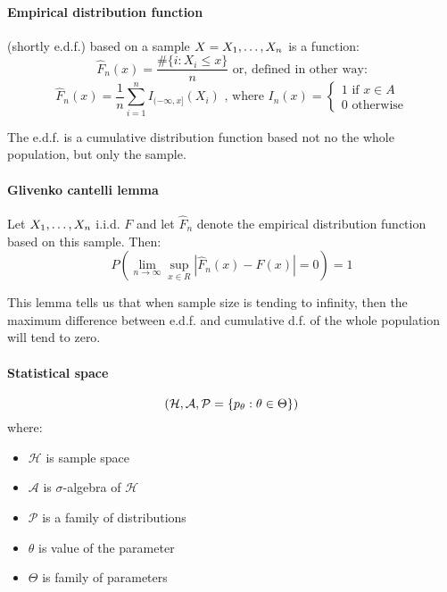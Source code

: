 \paragraph{Empirical distribution function} (shortly e.d.f.)
based on a sample $X = X_{1}, \ldots, X_{n}$ is a function:
\[ \hat{F}_n(x) = \frac{\#\{i: X_i \leq x\}}{n} \mbox{ or, defined in other way:} \]
\[ \hat{F}_n(x) = \frac{1}{n} \sum_{i=1}^{n} I_{(-\infty,x]} (X_i) 
\mbox{ , where }
I_n(x) = \begin{cases} 1 \mbox{ if } x \in A \\ 0 \mbox{ otherwise} \end{cases} \]

The e.d.f. is a cumulative distribution function based not no the whole population, but only the sample.

\paragraph{Glivenko cantelli lemma}

Let $X_{1}, \ldots, X_{n}$ i.i.d. $F$ and let $\hat{F}_n$ denote the empirical distribution
function based on this sample. Then:
\[  P ( \lim_{n \rightarrow \infty}  \sup_{x \in R} | \hat{F}_n(x) - F(x) | = 0 ) = 1 \]

This lemma tells us that when sample size is tending to infinity, then the maximum difference
between e.d.f. and cumulative d.f. of the whole population will tend to zero.

\paragraph{Statistical space}
\[  \left( \mathcal{H}, \mathcal{A}, \mathcal{P} = \left\{ p_\theta : \theta \in \Theta \right\} \right) \]
\noindent where:
\begin{itemize}[noitemsep,nolistsep]
  \item $\mathcal{H}$ is sample space
  
  \item $\mathcal{A}$ is $\sigma$-algebra of $\mathcal{H}$
  
  \item $\mathcal{P}$ is a family of distributions
  
  \item $\theta$ is value of the parameter
  
  \item $\Theta$ is family of parameters
\end{itemize}

